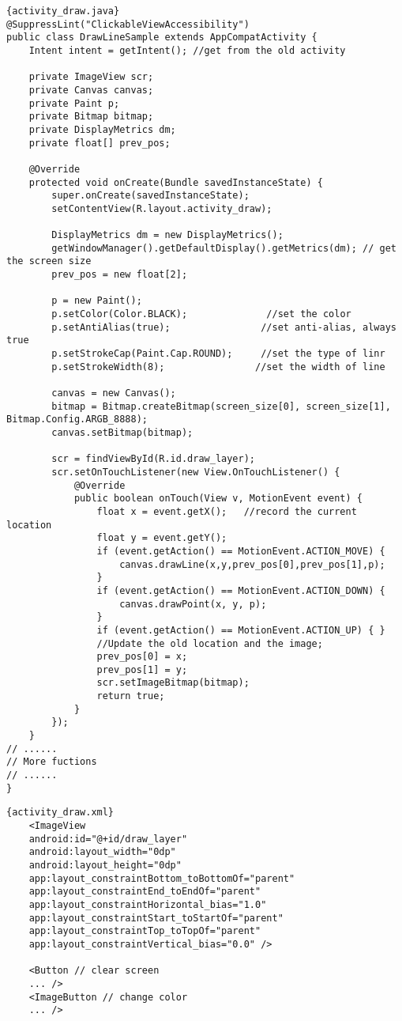 \documentclass[12pt]{report}
\begin{document}
\begin{lstlisting}{activity_draw.java}
@SuppressLint("ClickableViewAccessibility")
public class DrawLineSample extends AppCompatActivity {
	Intent intent = getIntent(); //get from the old activity
	
	private ImageView scr;
	private Canvas canvas;
	private Paint p;
	private Bitmap bitmap;
	private DisplayMetrics dm;
	private float[] prev_pos;
	
	@Override
	protected void onCreate(Bundle savedInstanceState) {
		super.onCreate(savedInstanceState);
		setContentView(R.layout.activity_draw);
		
		DisplayMetrics dm = new DisplayMetrics();
		getWindowManager().getDefaultDisplay().getMetrics(dm); // get the screen size
		prev_pos = new float[2];
	
		p = new Paint();
		p.setColor(Color.BLACK);              //set the color 
		p.setAntiAlias(true);                //set anti-alias, always true
		p.setStrokeCap(Paint.Cap.ROUND);     //set the type of linr
		p.setStrokeWidth(8);                //set the width of line
		
		canvas = new Canvas();
		bitmap = Bitmap.createBitmap(screen_size[0], screen_size[1], Bitmap.Config.ARGB_8888);
		canvas.setBitmap(bitmap);
		
		scr = findViewById(R.id.draw_layer);
		scr.setOnTouchListener(new View.OnTouchListener() {
			@Override
			public boolean onTouch(View v, MotionEvent event) {
				float x = event.getX();   //record the current location
				float y = event.getY();
				if (event.getAction() == MotionEvent.ACTION_MOVE) {    
					canvas.drawLine(x,y,prev_pos[0],prev_pos[1],p);
				}
				if (event.getAction() == MotionEvent.ACTION_DOWN) {    
					canvas.drawPoint(x, y, p);
				}
				if (event.getAction() == MotionEvent.ACTION_UP) { }
				//Update the old location and the image;
				prev_pos[0] = x;
				prev_pos[1] = y;
				scr.setImageBitmap(bitmap);
				return true;
			}
		});
	}
// ......
// More fuctions
// ......
}
\end{lstlisting}

\begin{lstlisting}{activity_draw.xml}
    <ImageView
	android:id="@+id/draw_layer"
	android:layout_width="0dp"
	android:layout_height="0dp"
	app:layout_constraintBottom_toBottomOf="parent"
	app:layout_constraintEnd_toEndOf="parent"
	app:layout_constraintHorizontal_bias="1.0"
	app:layout_constraintStart_toStartOf="parent"
	app:layout_constraintTop_toTopOf="parent"
	app:layout_constraintVertical_bias="0.0" />

	<Button // clear screen
	... />
	<ImageButton // change color
	... />
\end{lstlisting}
\end{document}
